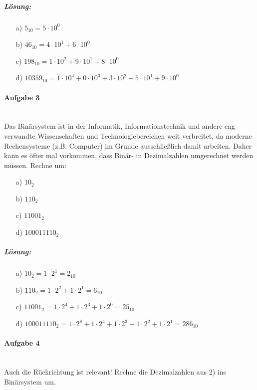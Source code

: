 \documentclass[12pt,a4paper,ngerman]{scrartcl}
\begin{document}
	\subparagraph{Lösung:} 
	\begin{itemize}
		\item[a)] $5_{10} = 5 \cdot 10^0$
		\item[b)] $46_{10} = 4 \cdot 10^1 + 6 \cdot 10^0$
		\item[c)] $198_{10} = 1 \cdot 10^2 + 9 \cdot 10^1 + 8 \cdot 10^0$
		\item[d)] $10359_{10} = 1 \cdot 10^4 + 0 \cdot 10^3 + 3 \cdot 10^2 + 5 \cdot 10^1 + 9 \cdot 10^0$
	\end{itemize}
		
	\paragraph{Aufgabe 3}\mbox{}\\	
		Das Binärsystem ist in der Informatik, Informationstechnik und andere eng verwandte Wissenschaften und Technologiebereichen weit verbreitet, da moderne Rechensysteme (z.B. Computer) im Grunde ausschließlich damit arbeiten. Daher kann es öfter mal vorkommen, dass Binär- in Dezimalzahlen umgerechnet werden müssen. Rechne um: 
	\begin{itemize}
		\item[a)] $10_{2}$
		\item[b)] $110_{2}$
		\item[c)] $11001_{2}$
		\item[d)] $100011110_{2}$
	\end{itemize}
	
	\subparagraph{Lösung:} 
	\begin{itemize}
		\item[a)] $10_{2} = 1 \cdot 2^1 = 2_{10}$
		\item[b)] $110_{2} = 1 \cdot 2^2 + 1 \cdot 2^1 = 6_{10}$
		\item[c)] $11001_{2} = 1 \cdot 2^4 + 1 \cdot 2^3 + 1 \cdot 2^0 = 25_{10}$
		\item[d)] $100011110_{2} 
		           = 1 \cdot 2^8 + 1 \cdot 2^4 + 1 \cdot 2^3 + 1 \cdot 2^2 +  1 \cdot 2^1
		           = 286_{10}$
	\end{itemize}

	\paragraph{Aufgabe 4}\mbox{}\\	
	Auch die Rückrichtung ist relevant! Rechne die Dezimalzahlen aus 2) ins Binärsystem um.
	
\end{document}
